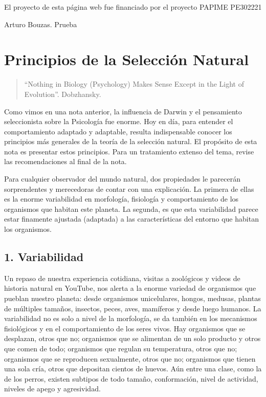 \documentclass[
  letterpaper,
]{book}
\begin{document}
El proyecto de esta página web fue financiado por el proyecto PAPIME
PE302221

Arturo Bouzas. Prueba


\chapter{Principios de la Selección
Natural}\label{principios-de-la-selecciuxf3n-natural}

\begin{quote}
``Nothing in Biology (Psychology) Makes Sense Except in the Light of
Evolution''. Dobzhansky.
\end{quote}

Como vimos en una nota anterior, la influencia de Darwin y el
pensamiento seleccionista sobre la Psicología fue enorme. Hoy en día,
para entender el comportamiento adaptado y adaptable, resulta
indispensable conocer los principios más generales de la teoría de la
selección natural. El propósito de esta nota es presentar estos
principios. Para un tratamiento extenso del tema, revise las
recomendaciones al final de la nota.

Para cualquier observador del mundo natural, dos propiedades le
parecerán sorprendentes y merecedoras de contar con una explicación. La
primera de ellas es la enorme variabilidad en morfología, fisiología y
comportamiento de los organismos que habitan este planeta. La segunda,
es que esta variabilidad parece estar finamente ajustada (adaptada) a
las características del entorno que habitan los organismos.

\section{1. Variabilidad}\label{variabilidad}

Un repaso de nuestra experiencia cotidiana, visitas a zoológicos y
videos de historia natural en YouTube, nos alerta a la enorme variedad
de organismos que pueblan nuestro planeta: desde organismos
unicelulares, hongos, medusas, plantas de múltiples tamaños, insectos,
peces, aves, mamíferos y desde luego humanos. La variabilidad no es solo
a nivel de la morfología, se da también en los mecanismos fisiológicos y
en el comportamiento de los seres vivos. Hay organismos que se
desplazan, otros que no; organismos que se alimentan de un solo producto
y otros que comen de todo; organismos que regulan su temperatura, otros
que no; organismos que se reproducen sexualmente, otros que no;
organismos que tienen una sola cría, otros que depositan cientos de
huevos. Aún entre una clase, como la de los perros, existen subtipos de
todo tamaño, conformación, nivel de actividad, niveles de apego y
agresividad.
\end{document}
